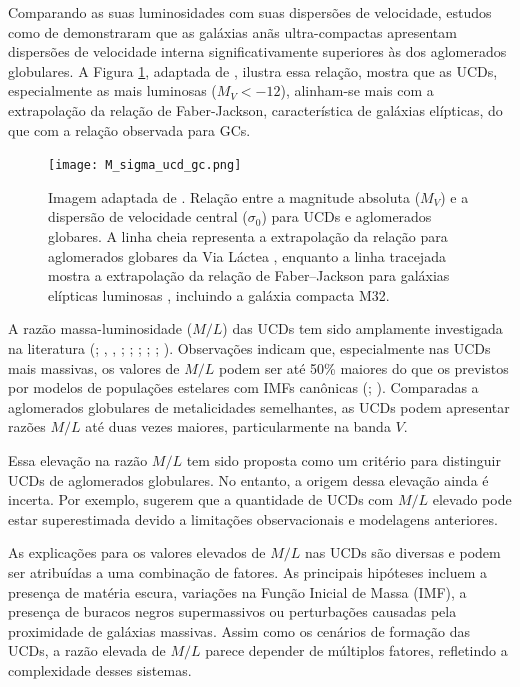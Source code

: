 Comparando as suas luminosidades com suas dispersões de velocidade, estudos como de \cite{Mieske_2008_2} demonstraram que as galáxias anãs ultra-compactas apresentam dispersões de velocidade interna significativamente superiores às dos aglomerados globulares. A Figura \ref{M_sigma_ucd_gc}, adaptada de \cite{Mieske_2008_2}, ilustra essa relação, mostra que as UCDs, especialmente as mais luminosas ($M_V < -12$), alinham-se mais com a extrapolação da relação de Faber-Jackson, característica de galáxias elípticas, do que com a relação observada para GCs.

\begin{figure}[!ht]
    \centering
    \texttt{[image: M\_sigma\_ucd\_gc.png]}
    \caption[]{Imagem adaptada de \cite{Mieske_2008_2}. Relação entre a magnitude absoluta ($M_V$) e a dispersão de velocidade central ($\sigma_0$) para UCDs e aglomerados globares. A linha cheia representa a extrapolação da relação para aglomerados globares da Via Láctea \citep{McLaughlin_2005}, enquanto a linha tracejada mostra a extrapolação da relação de Faber–Jackson para galáxias elípticas luminosas \citep{Faber_Jackson1976}, incluindo a galáxia compacta M32.}
    \label{M_sigma_ucd_gc}
\end{figure}

A razão massa-luminosidade ($M/L$) das UCDs tem sido amplamente investigada na literatura (\citealp{Hasegan_2005}; \citealp{Dabringhausen_2009}, \citeyear{Dabringhausen_2010}, \citeyear{Dabringhausen_2012}; \citealp{Baumgardt_2008}; \citealp{Mieske_2008_2}; \citealp{Taylor_2010}; \citealp{Frank_2011}; \citealp{Strader_2013}). Observações indicam que, especialmente nas UCDs mais massivas, os valores de $M/L$ podem ser até 50\% maiores do que os previstos por modelos de populações estelares com IMFs canônicas (\citealp{Hasegan_2005}; \citealp{Mieske_2008_2}). Comparadas a aglomerados globulares de metalicidades semelhantes, as UCDs podem apresentar razões $M/L$ até duas vezes maiores, particularmente na banda $V$.

Essa elevação na razão $M/L$ tem sido proposta como um critério para distinguir UCDs de aglomerados globulares. No entanto, a origem dessa elevação ainda é incerta. Por exemplo, \cite{Voggel_2018} sugerem que a quantidade de UCDs com $M/L$ elevado pode estar superestimada devido a limitações observacionais e modelagens anteriores.

As explicações para os valores elevados de $M/L$ nas UCDs são diversas e podem ser atribuídas a uma combinação de fatores. As principais hipóteses incluem a presença de matéria escura, variações na Função Inicial de Massa (IMF), a presença de buracos negros supermassivos ou perturbações causadas pela proximidade de galáxias massivas. Assim como os cenários de formação das UCDs, a razão elevada de $M/L$ parece depender de múltiplos fatores, refletindo a complexidade desses sistemas.

